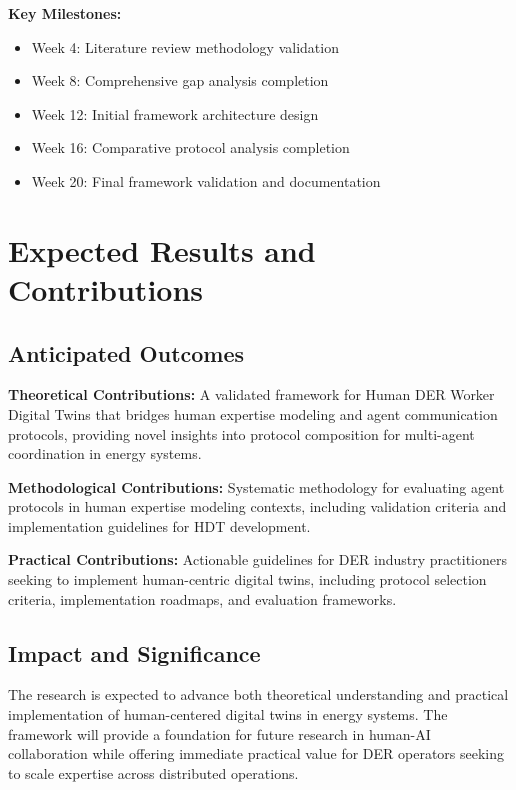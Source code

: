 \documentclass[12pt,a4paper]{article}
\begin{document}
\textbf{Key Milestones:}
\begin{itemize}
\item Week 4: Literature review methodology validation
\item Week 8: Comprehensive gap analysis completion
\item Week 12: Initial framework architecture design
\item Week 16: Comparative protocol analysis completion
\item Week 20: Final framework validation and documentation
\end{itemize}

\section{Expected Results and Contributions}
\label{sec:results}

\subsection{Anticipated Outcomes}

\textbf{Theoretical Contributions:} A validated framework for Human DER Worker Digital Twins that bridges human expertise modeling and agent communication protocols, providing novel insights into protocol composition for multi-agent coordination in energy systems.

\textbf{Methodological Contributions:} Systematic methodology for evaluating agent protocols in human expertise modeling contexts, including validation criteria and implementation guidelines for HDT development.

\textbf{Practical Contributions:} Actionable guidelines for DER industry practitioners seeking to implement human-centric digital twins, including protocol selection criteria, implementation roadmaps, and evaluation frameworks.

\subsection{Impact and Significance}

The research is expected to advance both theoretical understanding and practical implementation of human-centered digital twins in energy systems. The framework will provide a foundation for future research in human-AI collaboration while offering immediate practical value for DER operators seeking to scale expertise across distributed operations.
\end{document}

